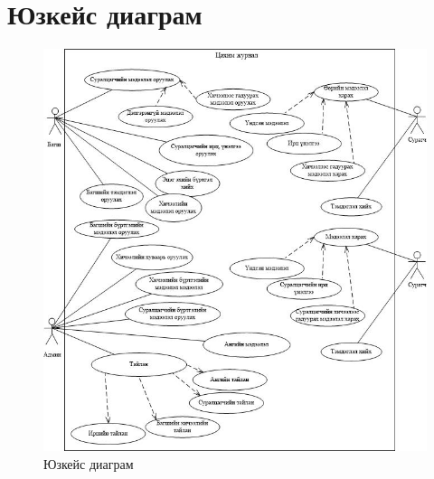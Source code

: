 \section{Юзкейс диаграм}
\begin{figure}[htbp]
	\centering
	\includegraphics[scale=0.8]{Diagrams/UseCase}
	\caption[Юзкейс диаграм]{Юзкейс диаграм}
	\label{fit:UseCase}
\end{figure}
